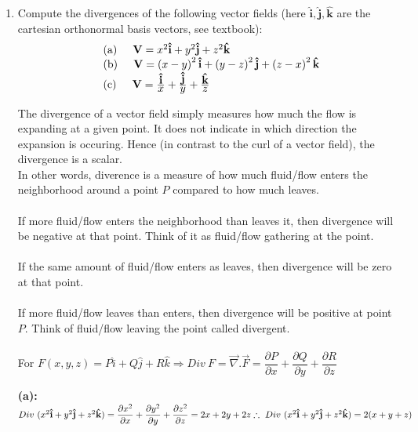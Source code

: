 \documentclass[fleqn]{article}
\begin{document}
\begin{enumerate}
    \item \label{ex.b} Compute the divergences of the following vector fields (here $\mathbf{\hat{i}},\mathbf{\hat{j}},\mathbf{\hat{k}}$ are the cartesian orthonormal basis vectors, see textbook): 
    \[
    \begin{array}{lll}
     & {\rm (a)\hspace{0.2in}}\mathbf{V}=x^{2}\mathbf{\hat{i}}+y^{2}\mathbf{\hat{j}}+z^{2}\mathbf{\hat{k}} \\ 
     & {\rm (b)\hspace{0.2in}}\mathbf{V}=\left(x-y\right) ^{2}\mathbf{\hat{i}}+\left( y-z\right) ^{2}\mathbf{\hat{j}}+\left( z-x\right) ^{2}\mathbf{\hat{k}} \\ 
     & {\rm (c)\hspace{0.2in}}\mathbf{V}=\frac{\textstyle \mathbf{\hat{i}}}{\textstyle x}+\frac{\textstyle \mathbf{\hat{j}}}{\textstyle y}+\frac{\textstyle \mathbf{\hat{k}}}{\textstyle z}
    \end{array}
    \]

      \textcolor{hwColor}{
        The divergence of a vector field simply measures how much the flow is expanding at a given point. It does not indicate in which direction the expansion is occuring. 
        Hence (in contrast to the curl of a vector field), the divergence is a scalar. \\
        In other words, diverence is a measure of how much fluid/flow enters the neighborhood around a point 
        $P$ compared to how much leaves. \\ \\
        If more fluid/flow enters the neighborhood than leaves it, 
        then divergence will be negative at that point. Think of it as fluid/flow gathering at the point. \\ \\
        If the same amount of fluid/flow enters as leaves, then divergence will be zero at that point. \\ \\
        If more fluid/flow leaves than enters, then divergence will be positive at point $P$. Think of 
        fluid/flow leaving the point called divergent. \\ \\
        For $F(x,y,z)=P \hat{i}+Q\hat{j}+R\hat{k} \Rightarrow Div ~ F=\overrightarrow{\nabla}.\overrightarrow{F}=\dfrac{\partial P}{\partial x}+\dfrac{\partial Q}{\partial y}+\dfrac{\partial R}{\partial z}$
      }

      \textcolor{hwColor}{
        \textbf{(a):} \\
        $
          Div ~ (x^2 \mathbf{\hat{i}}+y^2 \mathbf{\hat{j}}+z^2 \mathbf{\hat{k}})=\dfrac{\partial x^2}{\partial x}+\dfrac{\partial y^2}{\partial y}+\dfrac{\partial z^2}{\partial z}=2x+2y+2z \\
          \\
          \therefore ~ Div ~ (x^2 \mathbf{\hat{i}}+y^2 \mathbf{\hat{j}}+z^2 \mathbf{\hat{k}})=2(x+y+z) \\ \\
        $
      }


\end{enumerate}
\end{document}
